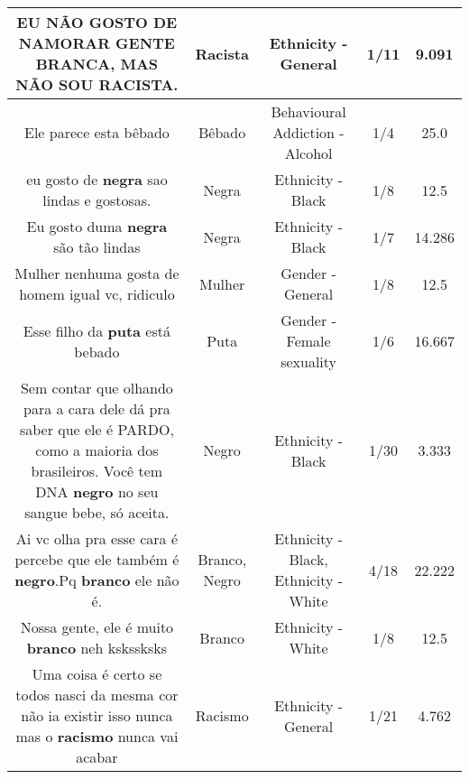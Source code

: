 \documentclass[11pt]{article}
\newlength\mylength
\begin{document}
\begin{center}
\begin{longtable}{|C{.65\mylength}|C{.30\mylength}|C{.12\mylength}|C{.12\mylength}|C{.12\mylength}|}
  \small EU NÃO GOSTO DE NAMORAR GENTE BRANCA, MAS NÃO SOU \textbf{RACISTA}.\normalsize   & Racista & Ethnicity - General & 1/11 & 9.091 \\  \hline
  \small Ele parece esta bêbado\normalsize   & Bêbado & Behavioural Addiction - Alcohol & 1/4 & 25.0 \\  \hline
  \small eu gosto de \textbf{negra} sao lindas e gostosas.\normalsize   & Negra & Ethnicity - Black & 1/8 & 12.5 \\  \hline
  \small Eu gosto duma \textbf{negra} são tão lindas\normalsize   & Negra & Ethnicity - Black & 1/7 & 14.286 \\  \hline
  \small Mulher nenhuma gosta de homem igual vc, ridiculo\normalsize   & Mulher & Gender - General & 1/8 & 12.5 \\  \hline
  \small Esse filho da \textbf{puta} está bebado\normalsize   & Puta & Gender - Female sexuality & 1/6 & 16.667 \\  \hline
  \small Sem contar que olhando para a cara dele dá pra saber que ele é PARDO, como a maioria dos brasileiros. Você tem DNA \textbf{negro} no seu sangue bebe, só aceita.\normalsize   & Negro & Ethnicity - Black & 1/30 & 3.333 \\  \hline
  \small Ai vc olha pra esse cara é percebe que ele também é \textbf{negro}.Pq \textbf{branco} ele não é.\normalsize   & Branco, Negro & Ethnicity - Black, Ethnicity - White & 4/18 & 22.222 \\  \hline
  \small Nossa gente, ele é muito \textbf{branco} neh kskssksks\normalsize   & Branco & Ethnicity - White & 1/8 & 12.5 \\  \hline
  \small Uma coisa é certo se todos nasci da mesma cor não ia existir isso nunca mas o \textbf{racismo} nunca vai acabar\normalsize   & Racismo & Ethnicity - General & 1/21 & 4.762 \\  \hline

\end{longtable}
\end{center}
\end{document}
